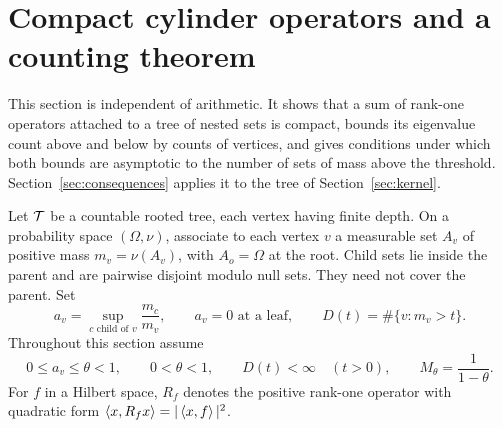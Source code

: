 \section{Compact cylinder operators and a counting theorem}\label{sec:tree}
This section is independent of arithmetic. It shows that a sum of rank-one
operators attached to a tree of nested sets is compact, bounds its
eigenvalue count above and below by counts of vertices, and gives conditions
under which both bounds are asymptotic to the number of sets of mass above
the threshold. Section~\ref{sec:consequences} applies it to the tree of
Section~\ref{sec:kernel}.

Let $\mathcal T$ be a countable rooted tree, each vertex having finite depth.
On a probability space $(\Omega,\nu)$, associate to each vertex $v$ a
measurable set $A_v$ of positive mass $m_v=\nu(A_v)$, with $A_o=\Omega$ at
the root. Child sets lie inside the parent and are pairwise disjoint modulo
null sets. They need not cover the parent. Set
\[
 a_v=\sup_{c\text{ child of }v}\frac{m_c}{m_v},
 \qquad a_v=0\text{ at a leaf},\qquad
 D(t)=\#\{v:m_v>t\}.
\]
Throughout this section assume
\begin{equation}\label{eq:tree-assumptions}
 0\le a_v\le\theta<1,\qquad 0<\theta<1,\qquad D(t)<\infty\quad(t>0),
 \qquad M_\theta=\frac1{1-\theta}.
\end{equation}
For $f$ in a Hilbert space, $R_f$ denotes the positive rank-one operator
with quadratic form $\left\langle x,R_fx\right\rangle=|\left\langle x,f\right\rangle|^2$.


